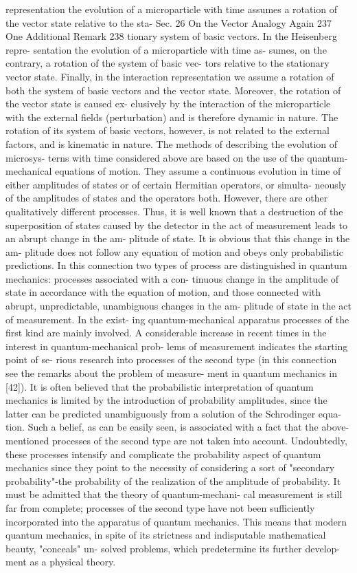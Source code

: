 \documentclass[a4paper,sfsidenotes,colorlinks=true]{tufte-book}
\numberwithin{equation}{section}
\numberwithin{figure}{section}
\begin{document}
{{{{{{representation the evolution of a microparticle with time assumes a rotation of the vector state relative to the sta-
Sec. 26
On the Vector Analogy Again
237
One Additional Remark
238
tionary system of basic vectors. In the Heisenberg repre- sentation the evolution of a microparticle with time as- sumes, on the contrary, a rotation of the system of basic vec- tors relative to the stationary vector state. Finally, in the interaction representation we assume a rotation of both the system of basic vectors and the vector state. Moreover, the rotation of the vector state is caused ex- elusively by the interaction of the microparticle with the external fields (perturbation) and is therefore dynamic in nature. The rotation of its system of basic vectors, however, is not related to the external factors, and is kinematic in nature.
The methods of describing the evolution of microsys- terns with time considered above are based on the use of the quantum-mechanical equations of motion. They assume a continuous evolution in time of either amplitudes of states or of certain Hermitian operators, or simulta- neously of the amplitudes of states and the operators both. However, there are other qualitatively different processes. Thus, it is well known that a destruction of the superposition of states caused by the detector in the act of measurement leads to an abrupt change in the am- plitude of state. It is obvious that this change in the am- plitude does not follow any equation of motion and obeys only probabilistic predictions.
In this connection two types of process are distinguished in quantum mechanics: processes associated with a con- tinuous change in the amplitude of state in accordance with the equation of motion, and those connected with abrupt, unpredictable, unambiguous changes in the am- plitude of state in the act of measurement. In the exist- ing quantum-mechanical apparatus processes of the first kind are mainly involved. A considerable increase in recent times in the interest in quantum-mechanical prob- lems of measurement indicates the starting point of se- rious research into processes of the second type (in this connection see the remarks about the problem of measure- ment in quantum mechanics in [42]).
It is often believed that the probabilistic interpretation of quantum mechanics is limited by the introduction of probability amplitudes, since the latter can be predicted unambiguously from a solution of the Schrodinger equa- tion. Such a belief, as can be easily seen, is associated with a fact that the above-mentioned processes of the second type are not taken into account. Undoubtedly, these processes intensify and complicate the probability aspect of quantum mechanics since they point to the necessity of considering a sort of "secondary probability"-the
probability of the realization of the amplitude of probability. It must be admitted that the theory of quantum-mechani- cal measurement is still far from complete; processes of the second type have not been sufficiently incorporated into the apparatus of quantum mechanics. This means that modern quantum mechanics, in spite of its strictness and indisputable mathematical beauty, "conceals" un- solved problems, which predetermine its further develop- ment as a physical theory.
\backmatter
}}}}}}
\end{document}
